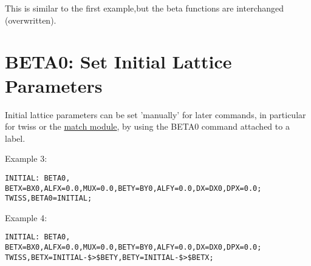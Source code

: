 This is similar to the first example,but the beta functions are interchanged (overwritten).  

\section{BETA0: Set Initial Lattice Parameters}

Initial lattice parameters can be set 'manually' for later commands, in
particular for twiss or the \href{../match/match.html}{match module}, by
using the BETA0 command attached to a label.  

Example 3: 
\begin{verbatim}
INITIAL: BETA0, BETX=BX0,ALFX=0.0,MUX=0.0,BETY=BY0,ALFY=0.0,DX=DX0,DPX=0.0;
TWISS,BETA0=INITIAL;
\end{verbatim}

Example 4: 
\begin{verbatim}
INITIAL: BETA0, BETX=BX0,ALFX=0.0,MUX=0.0,BETY=BY0,ALFY=0.0,DX=DX0,DPX=0.0;
TWISS,BETX=INITIAL-$>$BETY,BETY=INITIAL-$>$BETX;
\end{verbatim}





